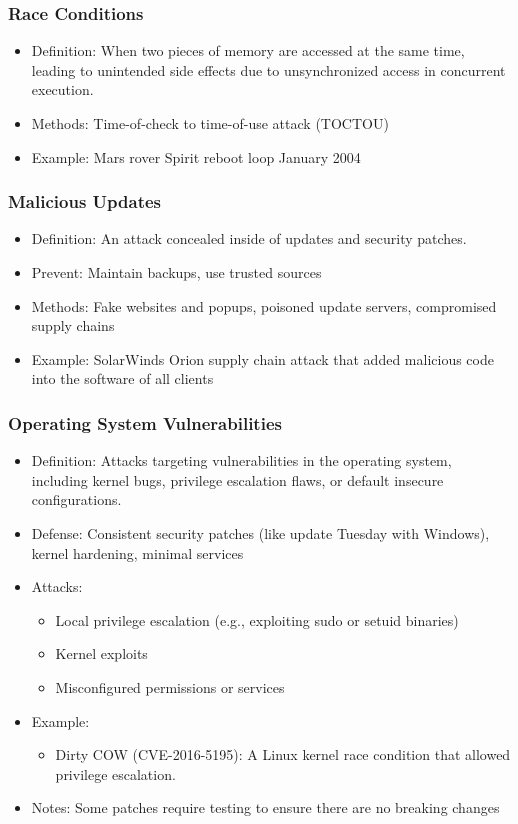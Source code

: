 \documentclass[11pt]{article}
\begin{document}
\subsubsection{Race Conditions}
\label{sec:orgd499386}
\begin{itemize}
\item Definition: When two pieces of memory are accessed at the same time, leading to unintended side effects due to unsynchronized access in concurrent execution.
\item Methods: Time-of-check to time-of-use attack (TOCTOU)
\item Example: Mars rover Spirit reboot loop January 2004
\end{itemize}
\subsubsection{Malicious Updates}
\label{sec:org079803e}
\begin{itemize}
\item Definition: An attack concealed inside of updates and security patches.
\item Prevent: Maintain backups, use trusted sources
\item Methods: Fake websites and popups, poisoned update servers, compromised supply chains
\item Example: SolarWinds Orion supply chain attack that added malicious code into the software of all clients
\end{itemize}
\subsubsection{Operating System Vulnerabilities}
\label{sec:orgb06bb07}
\begin{itemize}
\item Definition: Attacks targeting vulnerabilities in the operating system, including kernel bugs, privilege escalation flaws, or default insecure configurations.
\item Defense: Consistent security patches (like update Tuesday with Windows), kernel hardening, minimal services
\item Attacks:
\begin{itemize}
\item Local privilege escalation (e.g., exploiting sudo or setuid binaries)
\item Kernel exploits
\item Misconfigured permissions or services
\end{itemize}
\item Example:
\begin{itemize}
\item Dirty COW (CVE-2016-5195): A Linux kernel race condition that allowed privilege escalation.
\end{itemize}
\item Notes: Some patches require testing to ensure there are no breaking changes
\end{itemize}
\end{document}
